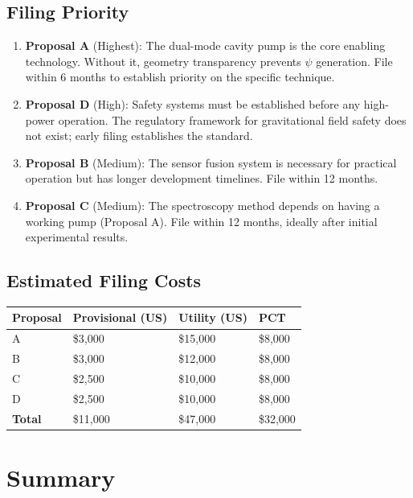 \documentclass[11pt,a4paper]{article}
\begin{document}
\subsection{Filing Priority}

\begin{enumerate}
\item \textbf{Proposal A} (Highest): The dual-mode cavity pump
is the core enabling technology.  Without it, geometry transparency
prevents $\psi$ generation.  File within 6 months to establish
priority on the specific technique.

\item \textbf{Proposal D} (High): Safety systems must be
established before any high-power operation.  The regulatory
framework for gravitational field safety does not exist; early
filing establishes the standard.

\item \textbf{Proposal B} (Medium): The sensor fusion system is
necessary for practical operation but has longer development
timelines.  File within 12 months.

\item \textbf{Proposal C} (Medium): The spectroscopy method
depends on having a working pump (Proposal A).  File within
12 months, ideally after initial experimental results.
\end{enumerate}

\subsection{Estimated Filing Costs}

\begin{longtable}{p{}p{}p{}p{}}
\toprule
\textbf{Proposal} & \textbf{Provisional (US)} & \textbf{Utility (US)}
& \textbf{PCT} \\
\midrule
\endhead
A & \$3,000 & \$15,000 & \$8,000 \\
B & \$3,000 & \$12,000 & \$8,000 \\
C & \$2,500 & \$10,000 & \$8,000 \\
D & \$2,500 & \$10,000 & \$8,000 \\
\midrule
\textbf{Total} & \$11,000 & \$47,000 & \$32,000 \\
\bottomrule
\end{longtable}

\section{Summary}
\end{document}

